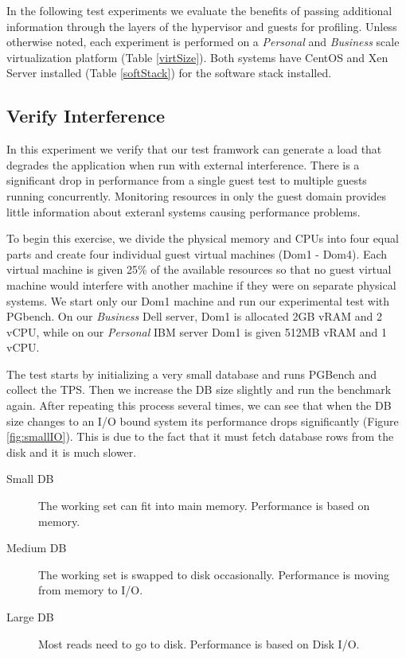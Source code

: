 In the following test experiments we evaluate the benefits of passing additional information through the layers of the hypervisor and guests for profiling.  Unless otherwise noted, each experiment is performed on a \emph{Personal} and \emph{Business} scale virtualization platform (Table \ref{virtSize}).  Both systems have CentOS and Xen Server installed (Table \ref{softStack}) for the software stack installed.

\subsection{Verify Interference}
In this experiment we verify that our test framwork can generate a load that degrades the application when run with external interference.  There is a significant drop in performance from a single guest test to multiple guests running concurrently. Monitoring resources in only the guest domain provides little information about exteranl systems causing performance problems. 

To begin this exercise, we divide the physical memory and CPUs into four equal parts and create four individual guest virtual machines (Dom1 - Dom4).  
Each virtual machine is given 25\% of the available resources so that no guest virtual machine would interfere with another machine if they were on separate physical systems.  
We start only our Dom1 machine and run our experimental test with PGbench.  
On our \emph{Business} Dell server, Dom1 is allocated 2GB vRAM and 2 vCPU, while on our \emph{Personal} IBM server Dom1 is given 512MB vRAM and 1 vCPU.  

The test starts by initializing a very small database and runs PGBench and collect the TPS.  
Then we increase the DB size slightly and run the benchmark again.  
After repeating this process several times, we can see that when the DB size changes to an I/O bound system its performance drops significantly (Figure \ref{fig:smallIO}).  
This is due to the fact that it must fetch database rows from the disk and it is much slower.  

\begin{description}
  \item[Small DB] The working set can fit into main memory.  Performance is based on memory.
  \item[Medium DB] The working set is swapped to disk occasionally. Performance is moving from memory to I/O.
  \item[Large DB] Most reads need to go to disk.  Performance is based on Disk I/O.
\end{description}

